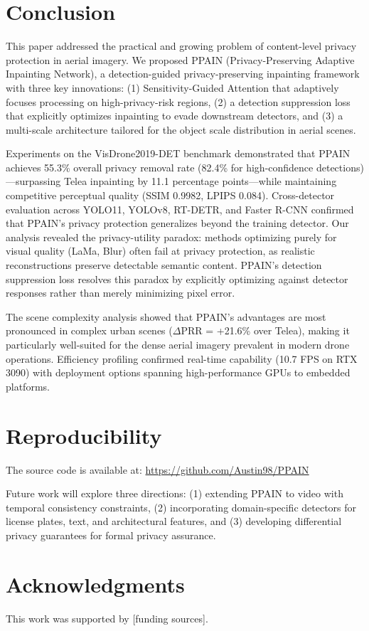\documentclass[preprint,12pt]{elsarticle}
\begin{document}
\section{Conclusion}
\label{sec:conclusion}

This paper addressed the practical and growing problem of content-level privacy protection in aerial imagery. We proposed PPAIN (Privacy-Preserving Adaptive Inpainting Network), a detection-guided privacy-preserving inpainting framework with three key innovations: (1) Sensitivity-Guided Attention that adaptively focuses processing on high-privacy-risk regions, (2) a detection suppression loss that explicitly optimizes inpainting to evade downstream detectors, and (3) a multi-scale architecture tailored for the object scale distribution in aerial scenes.

Experiments on the VisDrone2019-DET benchmark demonstrated that PPAIN achieves 55.3\% overall privacy removal rate (82.4\% for high-confidence detections)---surpassing Telea inpainting by 11.1 percentage points---while maintaining competitive perceptual quality (SSIM 0.9982, LPIPS 0.084). Cross-detector evaluation across YOLO11, YOLOv8, RT-DETR, and Faster R-CNN confirmed that PPAIN's privacy protection generalizes beyond the training detector. Our analysis revealed the privacy-utility paradox: methods optimizing purely for visual quality (LaMa, Blur) often fail at privacy protection, as realistic reconstructions preserve detectable semantic content. PPAIN's detection suppression loss resolves this paradox by explicitly optimizing against detector responses rather than merely minimizing pixel error.

The scene complexity analysis showed that PPAIN's advantages are most pronounced in complex urban scenes ($\Delta$PRR = +21.6\% over Telea), making it particularly well-suited for the dense aerial imagery prevalent in modern drone operations. Efficiency profiling confirmed real-time capability (10.7 FPS on RTX 3090) with deployment options spanning high-performance GPUs to embedded platforms.

\section*{Reproducibility}
The source code is available at: \url{https://github.com/Austin98/PPAIN}

Future work will explore three directions: (1) extending PPAIN to video with temporal consistency constraints, (2) incorporating domain-specific detectors for license plates, text, and architectural features, and (3) developing differential privacy guarantees for formal privacy assurance.

\section*{Acknowledgments}
This work was supported by [funding sources].



\end{document}
